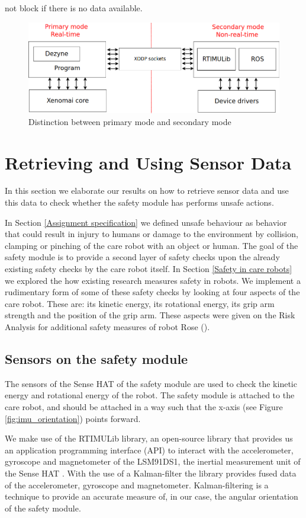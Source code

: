\documentclass[12pt]{scrreprt}
\begin{document}
not block if there is no data available.

\begin{figure}[H]
    \centering
    \includegraphics[width=\textwidth]{Figures/results/communication_scheme.png}
    \caption{Distinction between primary mode and secondary mode}
    \label{fig:communication_scheme}
\end{figure}

\section{Retrieving and Using Sensor Data}
In this section we elaborate our results on how to retrieve sensor data and use this data to check whether the safety module has performs unsafe actions.
\par
In Section \ref{Assignment specification} we defined unsafe behaviour as behavior that could result in injury to humans or damage to the environment by collision, clamping or pinching of the care robot with an object or human. The goal of the safety module is to provide a second layer of safety checks upon the already existing safety checks by the care robot itself. In Section \ref{Safety in care robots} we explored the how existing research measures safety in robots. We implement a rudimentary form of some of these safety checks by looking at four aspects of the care robot. These are: its kinetic energy, its rotational energy, its grip arm strength and the position of the grip arm. These aspects were given on the Risk Analysis for additional safety measures of robot Rose (\cite{risk_analysis_additional}).

\subsection{Sensors on the safety module}
The sensors of the Sense HAT of the safety module are used to check the kinetic energy and rotational energy of the robot. The safety module is attached to the care robot, and should be attached in a way such that the x-axis (see Figure \ref{fig:imu_orientation}) points forward.
\par
We make use of the RTIMULib library, an open-source library that provides us an application programming interface (API) to interact with the accelerometer, gyroscope and magnetometer of the LSM91DS1, the inertial measurement unit of the Sense HAT \cite{rtimulib}. With the use of a Kalman-filter the library provides fused data of the accelerometer, gyroscope and magnetometer. Kalman-filtering is a technique to provide an accurate measure of, in our case, the angular orientation of the safety module.
\end{document}
